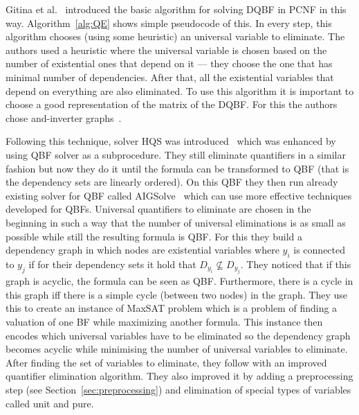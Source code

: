 \documentclass[
  digital, %
  color,
  twoside, %
  table,   %
  nolof,     %
  nolot,     %
]{fithesis3}
\theoremstyle{definition}
\theoremstyle{remark}
\begin{document}
Gitina et al.~\cite{HQSsimpleAlg} introduced the basic algorithm for solving DQBF in PCNF in this way. Algorithm~\ref{alg:QE} shows simple pseudocode of this. In every step, this algorithm chooses (using some heuristic) an universal variable to eliminate. The authors used a heuristic where the universal variable is chosen based on the number of existential ones that depend on it --- they choose the one that has minimal number of dependencies. After that, all the existential variables that depend on everything are also eliminated. To use this algorithm it is important to choose a good representation of the matrix of the DQBF. For this the authors chose and-inverter graphs~\cite{FRAIGs}. %

Following this technique, solver HQS was introduced~\cite{HQSquantifierElimination} which was enhanced by using QBF solver as a subprocedure. They still eliminate quantifiers in a similar fashion but now they do it until the formula can be transformed to QBF (that is the dependency sets are linearly ordered). On this QBF they then run already existing solver for QBF called AIGSolve~\cite{AIGSolve} which can use more effective techniques developed for QBFs. Universal quantifiers to eliminate are chosen in the beginning in such a way that the number of universal eliminations is as small as possible while still the resulting formula is QBF. For this they build a dependency graph in which nodes are existential variables where $y_i$ is connected to $y_j$ if for their dependency sets it hold that $D_{y_i} \not\subseteq D_{y_j}$. They noticed that if this graph is acyclic, the formula can be seen as QBF. Furthermore, there is a cycle in this graph iff there is a simple cycle (between two nodes) in the graph. They use this to create an instance of MaxSAT problem which is a problem of finding a valuation of one BF while maximizing another formula. This instance then encodes which universal variables have to be eliminated so the dependency graph becomes acyclic while minimising the number of universal variables to eliminate. After finding the set of variables to eliminate, they follow with an improved quantifier elimination algorithm. They also improved it by adding a preprocessing step (see Section~\ref{sec:preprocessing}) and elimination of special types of variables called unit and pure. 
\end{document}
